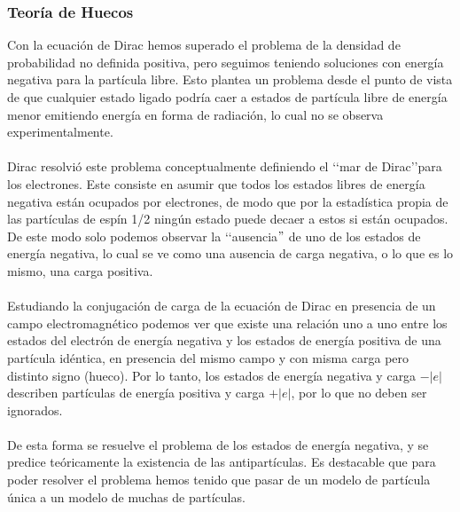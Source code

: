 \documentclass[11pt,letterpaper]{article}     %
\begin{document}
\subsubsection{Teoría de Huecos}        %




Con la ecuación de Dirac hemos superado el problema de la densidad de probabilidad no definida positiva, pero seguimos teniendo soluciones con energía negativa para la partícula libre. Esto plantea un problema desde el punto de vista de que cualquier estado ligado podría caer a estados de partícula libre de energía menor emitiendo energía en forma de radiación, lo cual no se observa experimentalmente. \\ \\
Dirac resolvió este problema conceptualmente definiendo el \lq \lq mar de Dirac\rq\rq  para los electrones. Este consiste en asumir que todos los estados libres de energía negativa están ocupados por electrones, de modo que por la estadística propia de las partículas de espín 1/2 ningún estado puede decaer a estos si están ocupados. De este modo solo podemos observar la \lq \lq ausencia$"$ de uno de los estados de energía negativa, lo cual se ve como una ausencia de carga negativa, o lo que es lo mismo, una carga positiva. \\ \\
Estudiando la conjugación de carga de la ecuación de Dirac en presencia de un campo electromagnético podemos ver que existe una relación uno a uno entre los estados del electrón de energía negativa y los estados de energía positiva de una partícula idéntica, en presencia del mismo campo y con misma carga pero distinto signo (hueco). Por lo tanto, los estados de energía negativa y carga $-|e|$ describen partículas de energía positiva y carga $+|e|$, por lo que no deben ser ignorados. \\ \\
De esta forma se resuelve el problema de los estados de energía negativa, y se predice teóricamente la existencia de las antipartículas. Es destacable que para poder resolver el problema hemos tenido que pasar de un modelo de partícula única a un modelo de muchas de partículas. \\
\end{document}

